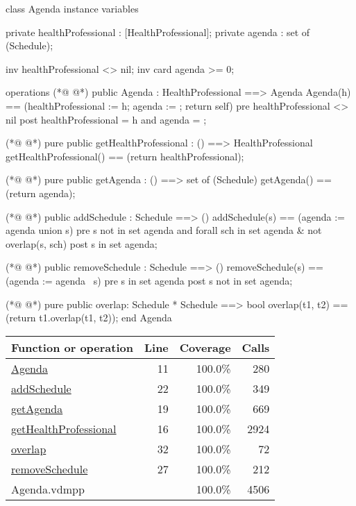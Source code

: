 \begin{vdmpp}[breaklines=true]
class Agenda
instance variables

private healthProfessional : [HealthProfessional];
private agenda : set of (Schedule);

inv healthProfessional <> nil;
inv card agenda >= 0;

operations
(*@
\label{Agenda:11}
@*)
 public Agenda : HealthProfessional ==> Agenda
  Agenda(h) == (healthProfessional := h; agenda := {}; return self)
 pre healthProfessional <> nil
 post healthProfessional = h and agenda = {};
 
(*@
\label{getHealthProfessional:16}
@*)
 pure public getHealthProfessional : () ==> HealthProfessional
  getHealthProfessional() == (return healthProfessional);
 
(*@
\label{getAgenda:19}
@*)
 pure public getAgenda : () ==> set of (Schedule)
  getAgenda() == (return agenda);
 
(*@
\label{addSchedule:22}
@*)
 public addSchedule : Schedule ==> ()
  addSchedule(s) == (agenda := agenda union {s})
 pre s not in set agenda and forall sch in set agenda & not overlap(s, sch)
 post s in set agenda;
 
(*@
\label{removeSchedule:27}
@*)
 public removeSchedule : Schedule ==> ()
  removeSchedule(s) == (agenda := agenda \ {s})
 pre s in set agenda
 post s not in set agenda;
 
(*@
\label{overlap:32}
@*)
 pure public overlap: Schedule * Schedule ==> bool
  overlap(t1, t2) == (return t1.overlap(t1, t2));
end Agenda
\end{vdmpp}
\bigskip
\begin{longtable}{|l|r|r|r|}
\hline
Function or operation & Line & Coverage & Calls \\
\hline
\hline
\hyperref[Agenda:11]{Agenda} & 11&100.0\% & 280 \\
\hline
\hyperref[addSchedule:22]{addSchedule} & 22&100.0\% & 349 \\
\hline
\hyperref[getAgenda:19]{getAgenda} & 19&100.0\% & 669 \\
\hline
\hyperref[getHealthProfessional:16]{getHealthProfessional} & 16&100.0\% & 2924 \\
\hline
\hyperref[overlap:32]{overlap} & 32&100.0\% & 72 \\
\hline
\hyperref[removeSchedule:27]{removeSchedule} & 27&100.0\% & 212 \\
\hline
\hline
Agenda.vdmpp & & 100.0\% & 4506 \\
\hline
\end{longtable}

